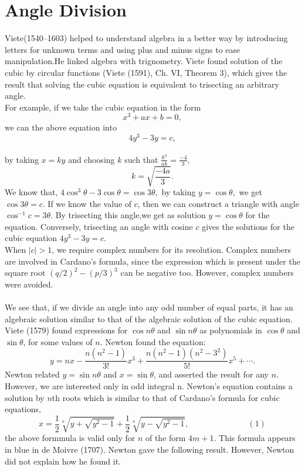 \documentclass[a4paper,reqno,11pt]{book}
\theoremstyle{plain}%
\theoremstyle{definition}
\begin{document}
\section{Angle Division}
Viete(1540–1603) helped to understand algebra in a better way by introducing letters for unknown terms and using plus and minus signs
to ease manipulation.He linked algebra with trignometry. Viete found solution of the cubic by circular functions (Viete (1591),
Ch. VI, Theorem 3), which gives the result that solving the cubic equation is equivalent to trisecting an arbitrary angle.\\
For example, if we take the cubic equation in the form
$$x^3 + ax + b = 0,$$
we can the above equation into
$$4y^3 - 3y = c,$$\\
by taking $x = ky$ and choosing $k$ such that $\frac{k^3}{ak} = \frac{-4}{3},$
$$k = \sqrt{\frac{-4a}{3}}.$$
We know that, $4\cos^3\theta - 3\cos\theta = \cos3\theta,$ by taking $y = \cos\theta,$ we get $\cos3\theta = c.$
If we know the value of $c$, then we can construct a triangle with angle $\cos^{-1}c = 3\theta$. By trisecting this angle,we get as solution $y = \cos \theta$ for the equation. 
Conversely, trisecting an angle with cosine $c$ gives the solutions for the cubic equation $4y^3 - 3y = c.$\\
\indent When $|c| > 1$, we require complex numbers for its resolution. Complex numbers are involved in Cardano’s formula, since the expression which is present under the square root $(q/2)^2 - (p/3)^3$ can be negative too. However, complex numbers were avoided.\\
\\
We see that, if we divide an angle into any odd number
of equal parts, it has an algebraic solution similar to that of the algebraic solution of the cubic equation. Viete (1579) found expressions for $\cos n\theta$ and $\sin n\theta$ as polynomials in $\cos \theta$ and $\sin\theta$, for some values of $n$. Newton found the equation:\\
$$y = nx - \frac{n(n^2-1)}{3!}x^3 + \frac{n(n^2-1)(n^2-3^2)}{5!}x^5 + \cdots.$$
Newton related $y = \sin n\theta$ and $x = \sin \theta$, and asserted the result for any $n$. However, we are interested only in odd integral n.
Newton’s equation contains a solution by $n$th roots which is similar to that of Cardano's formula for cubic equations,\\
$$x = \frac{1}{2}\sqrt[n]{y + \sqrt{y^2 - 1}} + \frac{1}{2}\sqrt[n]{y - \sqrt{y^2 - 1}}, \hspace{3cm} (1) $$
the above formmula is valid only for $n$ of the form $4m + 1$. This formula appears in blue in de Moivre (1707)\cite{ref 3}. Newton gave the following result. However, Newton did not explain how he found it.\\
\end{document}
